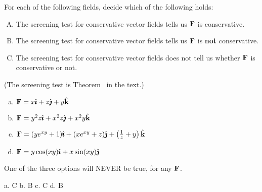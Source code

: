 \begin{question}
For each of the following fields, decide which of the following holds:
\begin{enumerate}[A.]
\item The screening test for conservative vector fields tells us $\mathbf{F}$ is conservative.
\item The screening test for conservative vector fields tells us $\mathbf{F}$ is \textbf{not} conservative.
\item The screening test for conservative vector fields does not tell us whether $\mathbf{F}$ is conservative or not.
\end{enumerate}
(The screening test is Theorem~ in the text.)

\begin{enumerate}[a.]
\item $\mathbf{F}=x\hat{\pmb{\imath}} + z\hat{\pmb{\jmath}} + y\hat{\mathbf{k}}$
\item $\mathbf{F}=y^2z\hat{\pmb{\imath}} + x^2z\hat{\pmb{\jmath}} + x^2y\hat{\mathbf{k}}$
\item $\mathbf{F}=(ye^{xy}+1)\hat{\pmb{\imath}} + (xe^{xy}+z)\hat{\pmb{\jmath}} + \left( \frac1z+y\right)\hat{\mathbf{k}}$
\item $\mathbf{F}=y\cos(xy)\hat{\pmb{\imath}} + x\sin(xy)\hat{\pmb{\jmath}} $
\end{enumerate}
\end{question}
\begin{hint}
One of the three options will NEVER be true, for any $\mathbf{F}$.
\end{hint}
\begin{answer}
a. C \qquad
b. B \qquad
c. C \qquad
d. B 
\end{answer}
